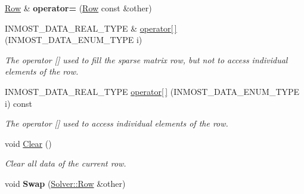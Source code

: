 \begin{DoxyCompactItemize}
\item 
\hypertarget{classINMOST_1_1Solver_1_1Row_a88fbacc12cd00bc3e9508e4180cb3d72}{\hyperlink{classINMOST_1_1Solver_1_1Row}{Row} \& {\bfseries operator=} (\hyperlink{classINMOST_1_1Solver_1_1Row}{Row} const \&other)}\label{classINMOST_1_1Solver_1_1Row_a88fbacc12cd00bc3e9508e4180cb3d72}

\item 
\hypertarget{classINMOST_1_1Solver_1_1Row_afaef4cd8aebf4d290f4503de194f7910}{I\-N\-M\-O\-S\-T\-\_\-\-D\-A\-T\-A\-\_\-\-R\-E\-A\-L\-\_\-\-T\-Y\-P\-E \& \hyperlink{classINMOST_1_1Solver_1_1Row_afaef4cd8aebf4d290f4503de194f7910}{operator\mbox{[}$\,$\mbox{]}} (I\-N\-M\-O\-S\-T\-\_\-\-D\-A\-T\-A\-\_\-\-E\-N\-U\-M\-\_\-\-T\-Y\-P\-E i)}\label{classINMOST_1_1Solver_1_1Row_afaef4cd8aebf4d290f4503de194f7910}

\begin{DoxyCompactList}\small\item\em The operator \mbox{[}\mbox{]} used to fill the sparse matrix row, but not to access individual elements of the row. \end{DoxyCompactList}\item 
\hypertarget{classINMOST_1_1Solver_1_1Row_ae65332e42ee2fdf2755d6200a7750eaf}{I\-N\-M\-O\-S\-T\-\_\-\-D\-A\-T\-A\-\_\-\-R\-E\-A\-L\-\_\-\-T\-Y\-P\-E \hyperlink{classINMOST_1_1Solver_1_1Row_ae65332e42ee2fdf2755d6200a7750eaf}{operator\mbox{[}$\,$\mbox{]}} (I\-N\-M\-O\-S\-T\-\_\-\-D\-A\-T\-A\-\_\-\-E\-N\-U\-M\-\_\-\-T\-Y\-P\-E i) const }\label{classINMOST_1_1Solver_1_1Row_ae65332e42ee2fdf2755d6200a7750eaf}

\begin{DoxyCompactList}\small\item\em The operator \mbox{[}\mbox{]} used to access individual elements of the row. \end{DoxyCompactList}\item 
\hypertarget{classINMOST_1_1Solver_1_1Row_ac86e436d943e530c3f0dd3d9f22b8fdf}{void \hyperlink{classINMOST_1_1Solver_1_1Row_ac86e436d943e530c3f0dd3d9f22b8fdf}{Clear} ()}\label{classINMOST_1_1Solver_1_1Row_ac86e436d943e530c3f0dd3d9f22b8fdf}

\begin{DoxyCompactList}\small\item\em Clear all data of the current row. \end{DoxyCompactList}\item 
\hypertarget{classINMOST_1_1Solver_1_1Row_aab38e0f7e84952a0bb62d23338445580}{void {\bfseries Swap} (\hyperlink{classINMOST_1_1Solver_1_1Row}{Solver\-::\-Row} \&other)}\label{classINMOST_1_1Solver_1_1Row_aab38e0f7e84952a0bb62d23338445580}


\end{DoxyCompactItemize}
